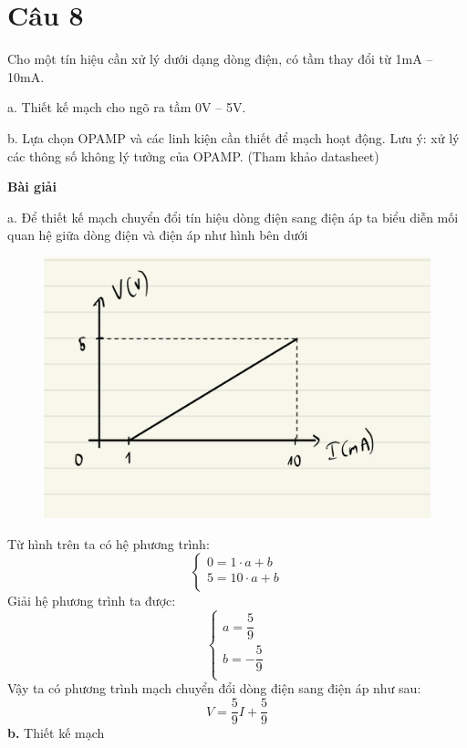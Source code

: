 \section{Câu 8}
Cho một tín hiệu cần xử lý dưới dạng dòng điện, có tầm thay đổi từ 1mA -- 10mA.

a. Thiết kế mạch cho ngõ ra tầm 0V -- 5V.

b. Lựa chọn OPAMP và các linh kiện cần thiết để mạch hoạt động. Lưu ý: xử lý các
thông số không lý tưởng của OPAMP. (Tham khảo datasheet)

\begin{center}
\textbf{Bài giải}
\end{center}

a. Để thiết kế mạch chuyển đổi tín hiệu dòng điện sang điện áp ta biểu diễn mối quan hệ giữa dòng điện và điện áp như hình bên dưới
\begin{figure}[H]
    \centering
    \includegraphics[scale=0.2]{image/C8_chart.png} 
\end{figure}
Từ hình trên ta có hệ phương trình:
\begin{equation*}
    \begin{cases}
        0 = 1\cdot a + b  \\
        5 = 10\cdot a + b\\
    \end{cases}
\end{equation*}
Giải hệ phương trình ta được:  
\begin{equation*}
    \begin{cases}
        a = \dfrac{5}{9} \\
        b = -\dfrac{5}{9} \\
    \end{cases}
\end{equation*}
Vậy ta có phương trình mạch chuyển đổi dòng điện sang điện áp như sau:
\begin{equation*}
    \boxed{V = \dfrac{5}{9}I + \dfrac{5}{9}}
\end{equation*}
\textbf{b.} Thiết kế mạch


